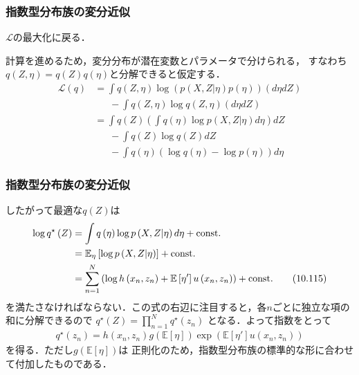 \documentclass[10pt,hyperref={unicode}]{beamer}
\newcommand{\parentheses}[1]{\left(#1\right)}
\newcommand{\brackets}[1]{\left[#1\right]}
\newcommand{\const}{\mathrm{const.}}
\newcommand{\energy}{\mathcal{L}}
\begin{document}
\begin{frame}
\frametitle{指数型分布族の変分近似}
$\energy$の最大化に戻る．

\bigskip

計算を進めるため，変分分布が潜在変数とパラメータで分けられる，
すなわち$q\parentheses{Z, \eta} = q\parentheses{Z}q\parentheses{\eta}$と分解できると仮定する．
\begin{align*}
    \energy\parentheses{q}
    &= \int q\parentheses{Z,\eta} \log \parentheses{%
            p \parentheses{X,Z|\eta}p \parentheses{\eta}
        }\parentheses{d\eta dZ} \\
    &\phantom{=}\ - \int q\parentheses{Z,\eta}\log q\parentheses{Z,\eta}\parentheses{d\eta dZ} \\
    &= \int q\parentheses{Z} \parentheses{%
            \int q\parentheses{\eta} \log p \parentheses{X,Z|\eta}d\eta
        }dZ \\
    &\phantom{=}\ -\int q\parentheses{Z} \log q \parentheses{Z} dZ \\
    &\phantom{=}\ -\int q\parentheses{\eta} \parentheses{\log q \parentheses{\eta} - \log p\parentheses{\eta}}d\eta
\end{align*}
\end{frame}

\begin{frame}
\frametitle{指数型分布族の変分近似}
したがって最適な$q\parentheses{Z}$は
\begin{align}
    \log q^\star\parentheses{Z}
    &= \int q\parentheses{\eta} \log p \parentheses{X,Z|\eta}d\eta + \const \notag \\
    &= \mathbb{E}_\eta \brackets{\log p\parentheses{X,Z|\eta}} + \const \notag \\
    &= \sum_{n = 1}^N \parentheses{\log h\parentheses{x_n, z_n} + \mathbb{E}\brackets{\eta'}u\parentheses{x_n,z_n}} + \const \tag{10.115}
\end{align}
を満たさなければならない．この式の右辺に注目すると，各$n$ごとに独立な項の和に分解できるので
$q^\star\parentheses{Z} = \prod_{n = 1}^N q^\star \parentheses{z_n}$
となる．よって指数をとって
\begin{align*}
    q^\star\parentheses{z_n} = h\parentheses{x_n,z_n}g\parentheses{\mathbb{E}\brackets{\eta}}\exp\parentheses{\mathbb{E}\brackets{\eta'}u\parentheses{x_n,z_n}}
    \tag{10.116}
\end{align*}
を得る．ただし$g\parentheses{\mathbb{E}\brackets{\eta}}$は
正則化のため，指数型分布族の標準的な形に合わせて付加したものである．
\end{frame}
\end{document}
